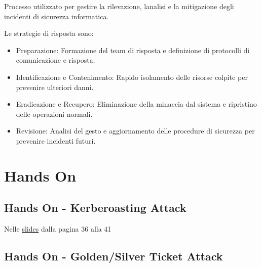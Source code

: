Processo utilizzato per gestire la rilevazione,
l\textquotesingle analisi e la mitigazione degli incidenti di sicurezza
informatica.

Le strategie di risposta sono:

\begin{itemize}
\item
  Preparazione: Formazione del team di risposta e definizione di
  protocolli di comunicazione e risposta.
\item
  Identificazione e Contenimento: Rapido isolamento delle risorse
  colpite per prevenire ulteriori danni.
\item
  Eradicazione e Recupero: Eliminazione della minaccia dal sistema e
  ripristino delle operazioni normali.
\item
  Revisione: Analisi del gesto e aggiornamento delle procedure di
  sicurezza per prevenire incidenti futuri.
\end{itemize}

\section{Hands On}\label{hands-on}

\subsection{Hands On - Kerberoasting
Attack}\label{hands-on---kerberoasting-attack}

Nelle
\href{https://liveunibo-my.sharepoint.com/personal/matteo_calvanico_studio_unibo_it/_layouts/15/onedrive.aspx?listurl=https\%3A\%2F\%2Fliveunibo\%2Esharepoint\%2Ecom\%2Fsites\%2FLoPTSI\%5FSedediImola\%2FShared\%20Documents&sortField=Modified&isAscending=false&viewid=2de89393\%2D6ac2\%2D4b19\%2Db369\%2D4ee1e0516a53&id=\%2Fsites\%2FLoPTSI\%5FSedediImola\%2FShared\%20Documents\%2FLABORATORIO\%20DI\%20SICUREZZA\%20DEI\%20SISTEMI\%20E\%20PRIVACY\%2FLaboratorio\%20di\%20sicurezza\%20dei\%20sistemi\%20informatici\%20e\%20privacy\%20\%2D\%2002\%20Active\%20Directory\%20Security\%20\%2D\%20V1R0\%2Epdf&parent=\%2Fsites\%2FLoPTSI\%5FSedediImola\%2FShared\%20Documents\%2FLABORATORIO\%20DI\%20SICUREZZA\%20DEI\%20SISTEMI\%20E\%20PRIVACY}{\ul{slides}}
dalla pagina 36 alla 41

\subsection{Hands On - Golden/Silver Ticket
Attack}\label{hands-on---goldensilver-ticket-attack}

